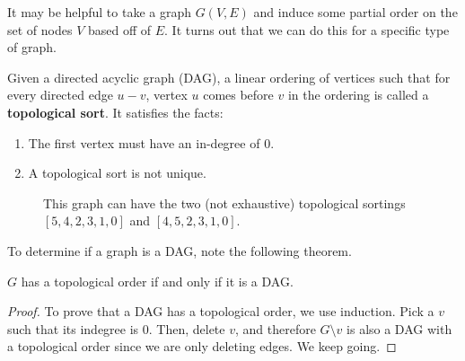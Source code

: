   It may be helpful to take a graph $G(V, E)$ and induce some partial order on the set of nodes $V$ based off of $E$. It turns out that we can do this for a specific type of graph. 
  
  \begin{definition}
    Given a directed acyclic graph (DAG), a linear ordering of vertices such that for every directed edge $u-v$, vertex $u$ comes before $v$ in the ordering is called a \textbf{topological sort}. It satisfies the facts: 
    \begin{enumerate}
      \item The first vertex must have an in-degree of $0$. 
      \item A topological sort is not unique. 
    \end{enumerate}

    \begin{figure}[H]
      \centering 
      \caption{This graph can have the two (not exhaustive) topological sortings $[5, 4, 2, 3, 1, 0]$ and $[4, 5, 2, 3, 1, 0]$.}
      \label{fig:top_sort_not_unique}
    \end{figure}
  \end{definition}

  To determine if a graph is a DAG, note the following theorem. 

  \begin{theorem}
    $G$ has a topological order if and only if it is a DAG. 
  \end{theorem}
  \begin{proof}
    To prove that a DAG has a topological order, we use induction. Pick a $v$ such that its indegree is $0$. Then, delete $v$, and therefore $G \setminus v$ is also a DAG with a topological order since we are only deleting edges. We keep going. 
  \end{proof}

